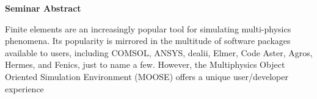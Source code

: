 \documentclass[12pt]{article}
\begin{document}
\textbf{Seminar Abstract}

Finite elements are an increasingly popular tool for simulating multi-physics
phenomena. Its popularity is mirrored in the multitude of software packages
available to users, including COMSOL, ANSYS, dealii, Elmer, Code Aster, Agros,
Hermes, and Fenics, just to name a few. However, the Multiphysics Object
Oriented Simulation Environment (MOOSE) offers a unique user/developer
experience
\end{document}
